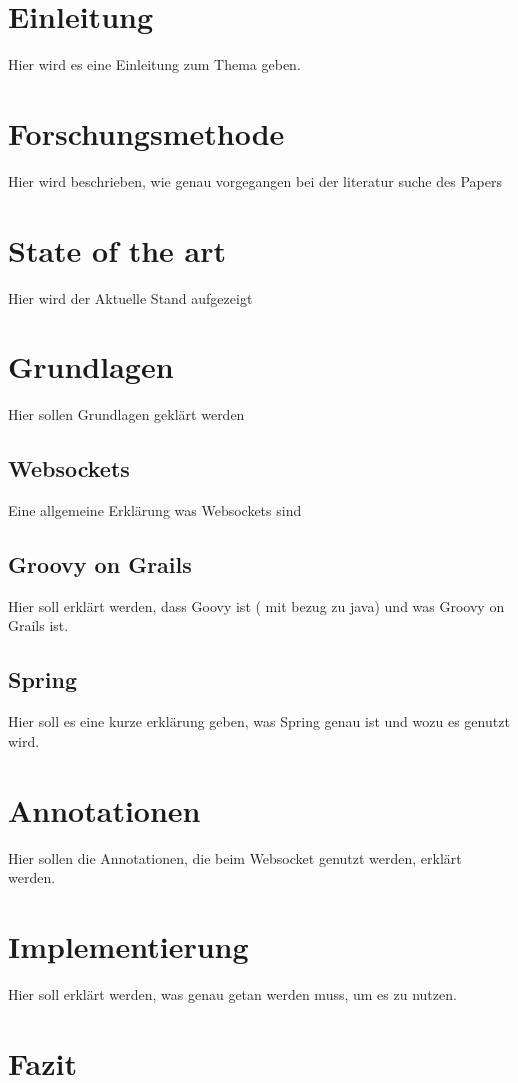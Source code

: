 \section{Einleitung}

Hier wird es eine Einleitung zum Thema geben. 

\section{Forschungsmethode}

Hier wird beschrieben, wie genau vorgegangen bei der literatur suche des Papers

\section{State of the art}

Hier wird der Aktuelle Stand aufgezeigt

\section{Grundlagen}

Hier sollen Grundlagen geklärt werden

\subsection{Websockets}

Eine allgemeine Erklärung was Websockets sind

\subsection{Groovy on Grails}

Hier soll erklärt werden, dass Goovy ist ( mit bezug zu java) und was Groovy on Grails ist.

\subsection{Spring}

Hier soll es eine kurze erklärung geben, was Spring genau ist und wozu es genutzt wird. 

\section{Annotationen}

Hier sollen die Annotationen, die beim Websocket genutzt werden, erklärt werden.

\section{Implementierung}

Hier soll erklärt werden, was genau getan werden muss, um es zu nutzen.


\section{Fazit}